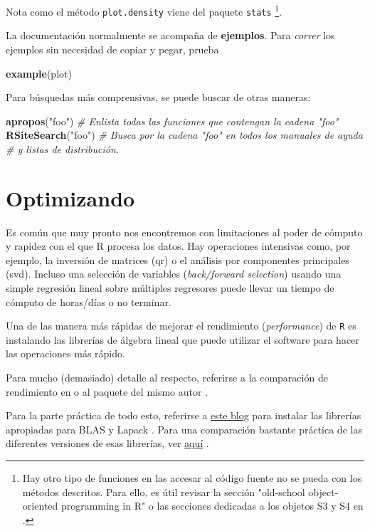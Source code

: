 \documentclass[]{article}
\newenvironment{Shaded}{\begin{snugshade}}{\end{snugshade}}
\newcommand{\KeywordTok}[1]{\textcolor[rgb]{0.13,0.29,0.53}{\textbf{#1}}}
\newcommand{\StringTok}[1]{\textcolor[rgb]{0.31,0.60,0.02}{#1}}
\newcommand{\CommentTok}[1]{\textcolor[rgb]{0.56,0.35,0.01}{\textit{#1}}}
\newcommand{\NormalTok}[1]{#1}
\let\rmarkdownfootnote\footnote%
\def\footnote{\protect\rmarkdownfootnote}
\begin{document}
Nota como el método \texttt{plot.density} viene del paquete
\texttt{stats}
\footnote{Hay otro tipo de funciones en las accesar al código fuente no se pueda con los métodos descritos. Para ello, es útil revisar la sección "old-school object-oriented programming in R" \parencite[][p.131-133]{adler2010r} o las secciones dedicadas a los objetos S3 y S4 en \textcite{wickham2014advanced}.}.

La documentación normalmente se acompaña de \textbf{ejemplos}. Para
\emph{correr} los ejemplos sin necesidad de copiar y pegar, prueba

\begin{Shaded}
\begin{Highlighting}[]
\KeywordTok{example}\NormalTok{(plot)}
\end{Highlighting}
\end{Shaded}

Para búsquedas más comprensivas, se puede buscar de otras maneras:

\begin{Shaded}
\begin{Highlighting}[]
\KeywordTok{apropos}\NormalTok{(}\StringTok{"foo"}\NormalTok{) }\CommentTok{# Enlista todas las funciones que contengan la cadena "foo"}
\KeywordTok{RSiteSearch}\NormalTok{(}\StringTok{"foo"}\NormalTok{) }\CommentTok{# Busca por la cadena "foo" en todos los manuales de ayuda }
\CommentTok{# y listas de distribución.}
\end{Highlighting}
\end{Shaded}

\section{Optimizando}\label{optimizando}

Es común que muy pronto nos encontremos con limitaciones al poder de
cómputo y rapidez con el que R procesa los datos. Hay operaciones
intensivas como, por ejemplo, la inversión de matrices (qr) o el
análisis por componentes principales (svd). Incluso una selección de
variables (\emph{back/forward selection}) usando una simple regresión
lineal sobre múltiples regresores puede llevar un tiempo de cómputo de
horas/días o no terminar.

Una de las manera más rápidas de mejorar el rendimiento
(\emph{performance}) de \texttt{R} es instalando las librerías de
álgebra lineal que puede utilizar el software para hacer las operaciones
más rápido.

Para mucho (demasiado) detalle al respecto, referirse a la comparación
de rendimiento en \textcite{eddelbuettel2010} o al paquete del mismo
autor \textcite{gcbd}.

Para la parte práctica de todo esto, referirse a
\href{http://brettklamer.com/diversions/statistical/faster-blas-in-r/}{este
blog} para instalar las librerías apropiadas para BLAS y Lapack
\parencite{blasinr}. Para una comparación bastante práctica de las
diferentes versiones de esas librerías, ver
\href{http://blog.nguyenvq.com/blog/2014/11/10/optimized-r-and-python-standard-blas-vs-atlas-vs-openblas-vs-mkl/}{aquí}
\parencite{optimizedr}.
\end{document}
